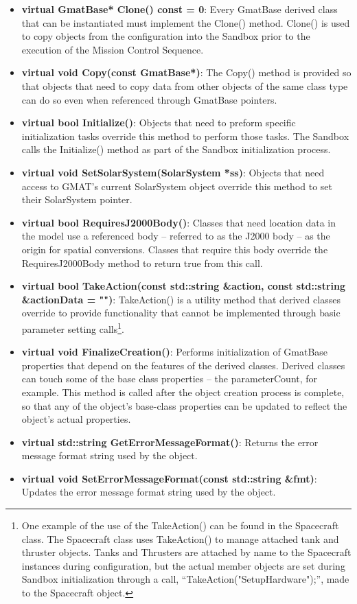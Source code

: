 \begin{itemize}
\item \textbf{virtual GmatBase* Clone() const = 0}: Every GmatBase derived class that can be
instantiated must implement the Clone() method.  Clone() is used to copy objects from the
configuration into the Sandbox prior to the execution of the Mission Control Sequence.
\item \textbf{virtual void Copy(const GmatBase*)}: The Copy() method is provided so that objects
that need to copy data from other objects of the same class type can do so even when referenced
through GmatBase pointers.
\item \textbf{virtual bool Initialize()}: Objects that need to preform specific initialization
tasks override this method to perform those tasks.  The Sandbox calls the Initialize() method as
part of the Sandbox initialization process.
\item \textbf{virtual void SetSolarSystem(SolarSystem *ss)}: Objects that need access to GMAT's
current SolarSystem object override this method to set their SolarSystem pointer.
\item \textbf{virtual bool RequiresJ2000Body()}: Classes that need location data in the model use a
referenced body -- referred to as the J2000 body -- as the origin for spatial conversions.  Classes
that require this body override the RequiresJ2000Body method to return true from this call.
\item \textbf{virtual bool TakeAction(const std::string \&action, const std::string \&actionData =
"")}:  TakeAction() is a utility method that derived classes override to provide functionality that
cannot be implemented through basic parameter setting calls\footnote{One example of the use of the
TakeAction() can be found in the Spacecraft class.  The Spacecraft class uses TakeAction() to
manage attached tank and thruster objects.  Tanks and Thrusters are attached by name to the
Spacecraft instances during configuration, but the actual member objects are set during Sandbox
initialization through a call, ``TakeAction("SetupHardware");'', made to the Spacecraft object.}.
\item \textbf{virtual void FinalizeCreation()}: Performs initialization of GmatBase properties that
depend on the features of the derived classes.  Derived classes can touch some of the base class
properties -- the parameterCount, for example.  This method is called after the object creation
process is complete, so that any of the object's base-class properties can be updated to reflect
the object's actual properties.
\item \textbf{virtual std::string GetErrorMessageFormat()}: Returns the error message format string
used by the object.
\item \textbf{virtual void SetErrorMessageFormat(const std::string \&fmt)}: Updates the error
message format string used by the object.
\end{itemize}

